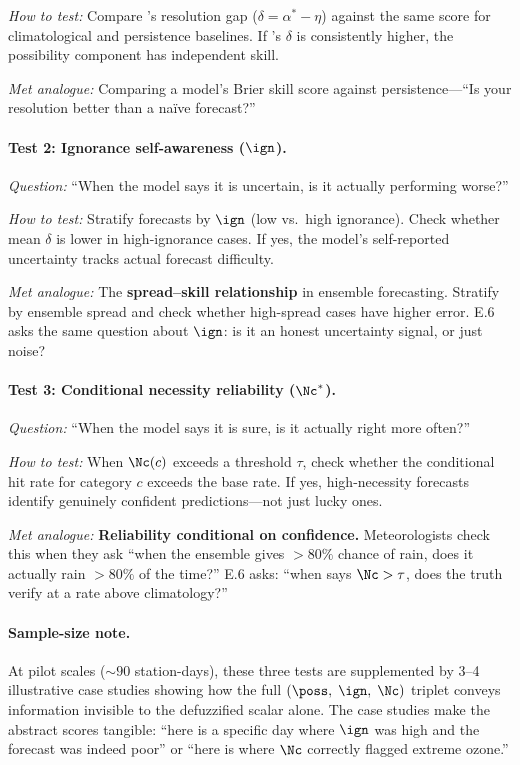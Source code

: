 \textit{How to test:} Compare \clyfar{}'s resolution gap ($\delta = \alpha^* - \eta$) against the same score for climatological and persistence baselines. If \clyfar{}'s $\delta$ is consistently higher, the possibility component has independent skill.

\textit{Met analogue:} Comparing a model's Brier skill score against persistence---``Is your resolution better than a na\"ive forecast?''

\paragraph{Test 2: Ignorance self-awareness ($\ign$).}
\textit{Question:} ``When the model says it is uncertain, is it actually performing worse?''

\textit{How to test:} Stratify forecasts by $\ign$ (low vs.\ high ignorance). Check whether mean $\delta$ is lower in high-ignorance cases. If yes, the model's self-reported uncertainty tracks actual forecast difficulty.

\textit{Met analogue:} The \textbf{spread--skill relationship} in ensemble forecasting. Stratify by ensemble spread and check whether high-spread cases have higher error. E.6 asks the same question about $\ign$: is it an honest uncertainty signal, or just noise?

\paragraph{Test 3: Conditional necessity reliability ($\Nc^*$).}
\textit{Question:} ``When the model says it is sure, is it actually right more often?''

\textit{How to test:} When $\Nc(c)$ exceeds a threshold $\tau$, check whether the conditional hit rate for category $c$ exceeds the base rate. If yes, high-necessity forecasts identify genuinely confident predictions---not just lucky ones.

\textit{Met analogue:} \textbf{Reliability conditional on confidence.} Meteorologists check this when they ask ``when the ensemble gives ${>}80\%$ chance of rain, does it actually rain ${>}80\%$ of the time?'' E.6 asks: ``when \clyfar{} says $\Nc > \tau$, does the truth verify at a rate above climatology?''

\paragraph{Sample-size note.}
At pilot scales (${\sim}90$ station-days), these three tests are supplemented by 3--4 illustrative case studies showing how the full $(\poss,\; \ign,\; \Nc)$ triplet conveys information invisible to the defuzzified scalar alone. The case studies make the abstract scores tangible: ``here is a specific day where $\ign$ was high and the forecast was indeed poor'' or ``here is where $\Nc$ correctly flagged extreme ozone.''

